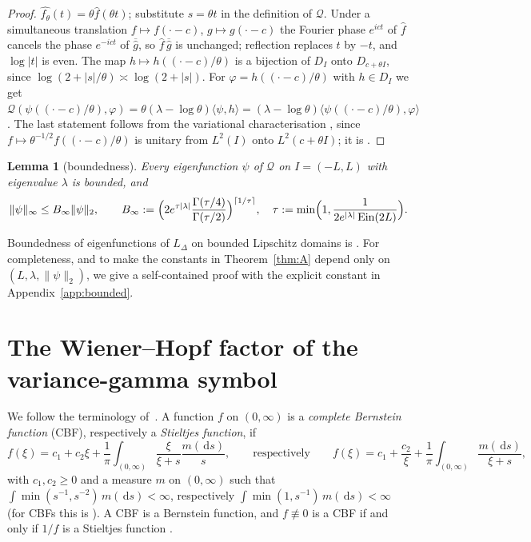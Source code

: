 \documentclass[11pt]{amsart}
\newcommand{\LD}{L_\Delta}
\newcommand{\dd}{\,\mathrm{d}}
\DeclareMathOperator{\Ein}{Ein}
\newtheorem{lemma}[theorem]{Lemma}
\theoremstyle{definition}
\theoremstyle{remark}
\numberwithin{equation}{section}
\begin{document}
\begin{proof}
$\widehat{f_\theta}(t)=\theta\hat f(\theta t)$; substitute $s=\theta t$ in the definition of $\mathcal Q$. Under a simultaneous translation $f\mapsto f(\cdot-c)$, $g\mapsto g(\cdot-c)$ the Fourier phase $e^{ict}$ of $\hat f$ cancels the phase $e^{-ict}$ of $\overline{\hat g}$, so $\hat f\,\overline{\hat g}$ is unchanged; reflection replaces $t$ by $-t$, and $\log|t|$ is even. The map $h\mapsto h((\cdot-c)/\theta)$ is a bijection of $D_I$ onto $D_{c+\theta I}$, since $\log(2+|s|/\theta)\asymp\log(2+|s|)$. For $\varphi=h((\cdot-c)/\theta)$ with $h\in D_I$ we get $\mathcal Q(\psi((\cdot-c)/\theta),\varphi)=\theta(\lambda-\log\theta)\langle\psi,h\rangle=(\lambda-\log\theta)\langle\psi((\cdot-c)/\theta),\varphi\rangle$. The last statement follows from the variational characterisation \cite[Thm.~1.4(i)]{CW19}, since $f\mapsto\theta^{-1/2}f((\cdot-c)/\theta)$ is unitary from $L^2(I)$ onto $L^2(c+\theta I)$; it is \cite[Lemma~2.5]{LW21}.
\end{proof}

\begin{lemma}[boundedness]\label{lem:bounded}
Every eigenfunction $\psi$ of $\mathcal Q$ on $I=(-L,L)$ with eigenvalue $\lambda$ is bounded, and
\[
\|\psi\|_\infty\le B_\infty\|\psi\|_2,\qquad B_\infty:=\Bigl(2e^{\tau|\lambda|}\frac{\Gamma(\tau/4)}{\Gamma(\tau/2)}\Bigr)^{\lceil1/\tau\rceil},\quad \tau:=\min\Bigl(1,\frac1{2e^{|\lambda|}\Ein(2L)}\Bigr).
\]
\end{lemma}

Boundedness of eigenfunctions of $\LD$ on bounded Lipschitz domains is \cite[Cor.~1.4]{FJW22}. For completeness, and to make the constants in Theorem~\ref{thm:A} depend only on $(L,\lambda,\|\psi\|_2)$, we give a self-contained proof with the explicit constant in Appendix~\ref{app:bounded}.

\section{The Wiener--Hopf factor of the variance-gamma symbol}\label{sec:WH}

We follow the terminology of~\cite[Sect.~2]{Kw11}. A function $f$ on $(0,\infty)$ is a \emph{complete Bernstein function} (CBF), respectively a \emph{Stieltjes function}, if
\[
f(\xi)=c_1+c_2\xi+\frac1\pi\int_{(0,\infty)}\frac{\xi}{\xi+s}\frac{m(\dd s)}s,\qquad\text{respectively}\qquad f(\xi)=c_1+\frac{c_2}\xi+\frac1\pi\int_{(0,\infty)}\frac{m(\dd s)}{\xi+s},
\]
with $c_1,c_2\ge0$ and a measure $m$ on $(0,\infty)$ such that $\int\min(s^{-1},s^{-2})\,m(\dd s)<\infty$, respectively $\int\min(1,s^{-1})\,m(\dd s)<\infty$ (for CBFs this is \cite[Cor.~2.16(b)]{Kw11}). A CBF is a Bernstein function, and $f\not\equiv0$ is a CBF if and only if $1/f$ is a Stieltjes function \cite[Prop.~2.17(a)]{Kw11}.
\end{document}

